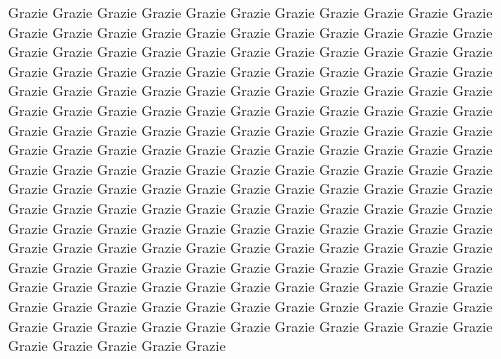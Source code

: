\renewcommand{\sfdefault}{phv}
Grazie Grazie Grazie Grazie Grazie Grazie Grazie Grazie Grazie Grazie Grazie Grazie Grazie Grazie Grazie Grazie Grazie Grazie Grazie Grazie Grazie Grazie Grazie Grazie Grazie Grazie Grazie Grazie Grazie Grazie Grazie Grazie Grazie Grazie Grazie Grazie Grazie Grazie Grazie Grazie Grazie Grazie Grazie Grazie Grazie Grazie Grazie Grazie Grazie Grazie Grazie Grazie Grazie Grazie Grazie Grazie Grazie Grazie Grazie Grazie Grazie Grazie Grazie Grazie Grazie Grazie Grazie Grazie Grazie Grazie Grazie Grazie Grazie Grazie Grazie Grazie Grazie Grazie Grazie Grazie Grazie Grazie Grazie Grazie Grazie Grazie Grazie Grazie Grazie Grazie Grazie Grazie Grazie Grazie Grazie Grazie Grazie Grazie Grazie Grazie Grazie Grazie Grazie Grazie Grazie Grazie Grazie Grazie Grazie Grazie Grazie Grazie Grazie Grazie Grazie Grazie Grazie Grazie Grazie Grazie Grazie Grazie Grazie Grazie Grazie Grazie Grazie Grazie Grazie Grazie Grazie Grazie Grazie Grazie Grazie Grazie Grazie Grazie Grazie Grazie Grazie Grazie Grazie Grazie Grazie Grazie Grazie Grazie Grazie Grazie Grazie Grazie Grazie Grazie Grazie Grazie Grazie Grazie Grazie Grazie Grazie Grazie Grazie Grazie Grazie Grazie Grazie Grazie Grazie Grazie Grazie Grazie Grazie Grazie Grazie Grazie Grazie Grazie Grazie Grazie Grazie Grazie Grazie Grazie Grazie Grazie Grazie Grazie Grazie Grazie Grazie Grazie 